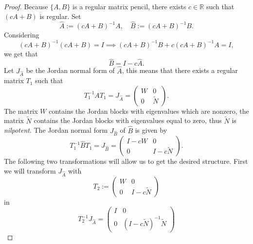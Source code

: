 \begin{proof}
	Because $\{A,B\}$ is a regular matrix pencil, there exists $c \in \mathbb{R}$ such that $(cA+B)$ is regular. Set
	\begin{displaymath}
		\hat{A} := (cA+B)^{-1}A, \quad \hat{B} := (cA+B)^{-1}B.
	\end{displaymath}
	Considering 
	\begin{displaymath}
		(cA+B)^{-1}(cA+B) = I \implies (cA+B)^{-1}B+c(cA+B)^{-1}A = I ,
	\end{displaymath}
	we get that
	\begin{displaymath}
		\hat{B} = I-c \hat{A} .
	\end{displaymath}
	Let $J_ {\hat{A}}$ be the Jordan normal form of $\hat{A}$, this means that there exists a regular matrix $T_1$ such that
	\begin{displaymath}
		T_1^{-1}AT_1 = J_{\hat{A}} =
		\left(
		\begin{matrix}
			W & 0 \\
			0 & \tilde{N} 
		\end{matrix}
		\right) .
	\end{displaymath}
	The matrix $W$ contains the Jordan blocks with eigenvalues which are nonzero, the matrix $\tilde{N}$ contains the Jordan blocks with eigenvalues equal to zero, thus $\tilde{N}$ is \emph{nilpotent}.
	The Jordan normal form $J_{\hat{B}}$ of $\hat{B}$ is given by
	\begin{displaymath}
		T_1^{-1} \hat{B} T_1 = J_{\hat{B}} = 
		\left(
		\begin{matrix}
			I-cW & 0 \\
			0 & I-c\tilde{N}
		\end{matrix}
		\right) .
	\end{displaymath}
	The following two transformations will allow us to get the desired structure.
	First we will transform $J_{\hat{A}}$ with
	\begin{displaymath}
		T_2 :=
		\left(
		\begin{matrix}
			W & 0 \\
			0 & I-c\tilde{N}
		\end{matrix}
		\right)
	\end{displaymath}
	in
	\begin{displaymath}
		T_2^{-1}J_{\hat{A}} = 
		\left(
		\begin{matrix}
			I & 0 \\
			0 & (I-c\tilde{N})^{-1}\tilde{N}
		\end{matrix}
		\right)
	\end{displaymath}

\end{proof}

